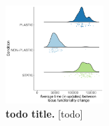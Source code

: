 \begin{figure}[h!]
    \centering
    \includegraphics[width=0.33\textwidth]{media/architecture/avg_time_between_func_changes_weighted_mean.pdf}
    \caption{\small
        \textbf{todo title.}
        [todo]
    }
    \label{fig:architecture_locus_change_time}
\end{figure}